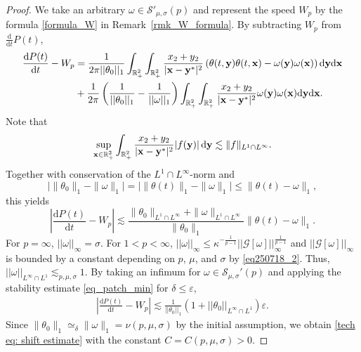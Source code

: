 \documentclass[11pt]{amsart}
\theoremstyle{definition}
\theoremstyle{definition}
\numberwithin{equation}{section}
\newcommand{\0}{\emptyset}
\newcommand{\tht}{\theta}
\newcommand{\bfx}{{\bf x}}
\newcommand{\bfy}{{\bf y}}
\newcommand{\bbR}{\mathbb R}
\newcommand{\calS}{\mathcal S}
\newcommand{\dd}{\mathrm{d}}
\begin{document}
			\begin{proof}
				We take an arbitrary $\omega\in \calS'_{\mu, \sigma}(p) $ and represent the speed $W_{p} $ by the formula \eqref{formula_W} in Remark~\ref{rmk_W_formula}.
                By subtracting $W_{p}$ from $\frac{\dd}{\dd t} P(t)$, 
				\begin{align*}
					\frac{\dd P(t)}{\dd t}-W_{p}
					&=\frac{1}{2\pi ||\theta_0||_{1}} \int_{\bbR^2_+}\int_{\bbR^2_+} \frac{x_2+y_2}{|\bfx-\bfy^*|^2} \left(\tht(t,\bfy)\tht(t,\bfx)-\omega(\bfy)\omega(\bfx)  \right)\dd\bfy\dd\bfx\\
					&+\frac{1}{2\pi}\left(\frac{1}{||\theta_0||_{1}}-\frac{1}{||\omega||_{1}} \right)\int_{\bbR^2_+}\int_{\bbR^2_+}\frac{x_2+y_2}{|\bfx-\bfy^*|^2} \omega(\bfy)\omega(\bfx) \dd\bfy\dd\bfx.
				\end{align*}
{
Note that
\[
\sup_{\bfx\in\bbR^2_+} \int_{\bbR^2_+} \frac{x_2+y_2}{|\bfx-\bfy^*|^2} |f(\bfy)| \,\dd\bfy \lesssim \|f\|_{L^1\cap L^\infty}.
\]
Together with conservation of the $L^1\cap L^\infty$-norm and
\[
\bigl|\|\theta_0\|_1-\|\omega\|_1\bigr| = \bigl|\|\theta(t)\|_1-\|\omega\|_1\bigr| \le \|\theta(t)-\omega\|_1,
\]
this yields
    \[
    \left|\frac{\dd P(t)}{\dd t}-W_p\right| \lesssim \frac{\|\theta_0\|_{L^1\cap L^\infty} + \|\omega\|_{L^1\cap L^\infty}} {\|\theta_0\|_1} \|\theta(t)-\omega\|_1 .
    \]
}
				For $p=\infty$, $||\omega||_{\infty}=\sigma$.
				For $1<p<\infty$, $||\omega||_{\infty}\leq \kappa^{-\frac{1}{p-1}}||\mathcal{G}[\omega] ||_{\infty}^{\frac{1}{p-1}}$ and $||\mathcal{G}[\omega] ||_{\infty}$ is bounded by a  constant depending on $p$, $\mu$, and $\sigma$ by \eqref{eq250718_2}.
				Thus, $||\omega||_{L^{\infty}\cap L^{1}} \lesssim_{p, \mu, \sigma} 1 $.
				By taking an infimum for $\omega\in \calS_{\mu, \sigma}'(p)$ and applying the stability estimate \eqref{eq_patch_min} for $\delta\leq \varepsilon$, 
				\begin{align*}
					\left| \frac{\dd P(t)}{\dd t} -W_{p}\right|\lesssim \frac{1}{ ||\theta_0||_{1}} \left( 1 + ||\theta_0||_{L^{\infty}\cap L^{1}}  \right) \varepsilon.
				\end{align*} 
				Since $\|\theta_0\|_1 \simeq_{\delta} \|\omega\|_1=\nu(p, \mu, \sigma)$ by the initial assumption, we obtain \eqref{tech eq: shift estimate} with the constant $C=C\left(  p, \mu, \sigma\right)>0$.
			\end{proof}
			
\end{document}
